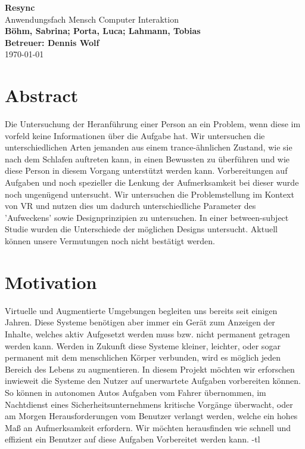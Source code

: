 \documentclass[a4paper, 11pt]{article}
\newcommand{\projectName}{Resync}
\begin{document}
\begin{center}
	\textbf{\LARGE{\projectName}}\\
    \large{Anwendungsfach Mensch Computer Interaktion}\\
	\vspace{7mm}
    \textbf{\large{Böhm, Sabrina; Porta, Luca; Lahmann, Tobias}}\\
	\textbf{\large{Betreuer: Dennis Wolf}}\\
	\today
\end{center}

\section*{Abstract}
Die Untersuchung der Heranführung einer Person an ein Problem, wenn diese im vorfeld keine Informationen über die Aufgabe hat. %
Wir untersuchen die unterschiedlichen Arten jemanden aus einem trance-ähnlichen Zustand, wie sie nach dem Schlafen auftreten kann, in einen Bewussten zu überführen und wie diese Person in diesem Vorgang unterstützt werden kann. %
Vorbereitungen auf Aufgaben und noch spezieller die Lenkung der Aufmerksamkeit bei dieser wurde noch ungenügend untersucht. %
Wir untersuchen die Problemstellung im Kontext von VR und nutzen dies um dadurch unterschiedliche Parameter des 'Aufweckens' sowie Designprinzipien zu untersuchen. %
In einer between-subject Studie wurden die Unterschiede der möglichen Designs untersucht. %
Aktuell können unsere Vermutungen noch nicht bestätigt werden. %

\section*{Motivation}
Virtuelle und Augmentierte Umgebungen begleiten uns bereits seit einigen Jahren. Diese Systeme benötigen aber immer ein Gerät zum Anzeigen der Inhalte, welches aktiv Aufgesetzt werden muss bzw. nicht permanent getragen werden kann. Werden in Zukunft diese Systeme kleiner, leichter, oder sogar permanent mit dem menschlichen Körper verbunden, wird es möglich jeden Bereich des Lebens zu augmentieren. In diesem Projekt möchten wir erforschen inwieweit die Systeme den Nutzer auf unerwartete Aufgaben vorbereiten können. So können in autonomen Autos Aufgaben vom Fahrer übernommen, im Nachtdienst eines Sicherheitsunternehmens kritische Vorgänge überwacht, oder am Morgen Herausforderungen vom Benutzer verlangt werden, welche ein hohes Maß an Aufmerksamkeit erfordern. Wir möchten herausfinden wie schnell und effizient ein Benutzer auf diese Aufgaben Vorbereitet werden kann. -tl
\end{document}

